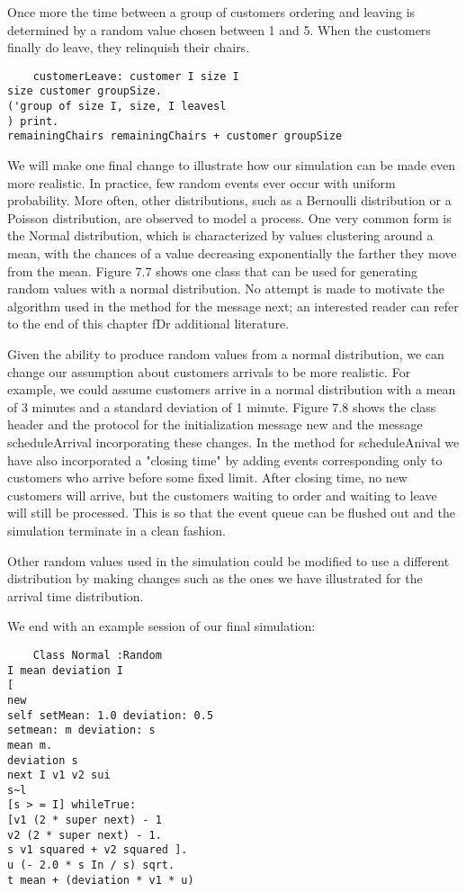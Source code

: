 Once more the time between a group of customers ordering and leaving
is determined by a random value chosen between 1 and 5. When the
customers finally do leave, they relinquish their chairs.

\begin{lstlisting}
    customerLeave: customer I size I
size customer groupSize.
('group of size I, size, I leavesl
) print.
remainingChairs remainingChairs + customer groupSize
\end{lstlisting}

We will make one final change to illustrate how our simulation can be made even
more realistic. In practice, few random events ever occur with uniform
probability. More often, other distributions, such as a Bernoulli distribution
or a Poisson distribution, are observed to model a process. One very common form
is the Normal distribution, which is characterized by values clustering around a
mean, with the chances of a value decreasing exponentially the farther they move
from the mean. Figure 7.7 shows one class that can be used for generating random
values with a normal distribution. No attempt is made to motivate the algorithm
used in the method for the message next; an interested reader can refer to the
end of this chapter fDr additional literature.

Given the ability to produce random values from a normal distribution, we can
change our assumption about customers arrivals to be more realistic. For
example, we could assume customers arrive in a normal distribution with a mean
of 3 minutes and a standard deviation of 1 minute. Figure 7.8 shows the class
header and the protocol for the initialization message new and the message
scheduleArrival incorporating these changes. In the method for scheduleAnival we
have also incorporated a "closing time" by adding events corresponding only to
customers who arrive before some fixed limit. After closing time, no new
customers will arrive, but the customers waiting to order and waiting to leave
will still be processed. This is so that the event queue can be flushed out and
the simulation terminate in a clean fashion.

Other random values used in the simulation could be modified to use a different
distribution by making changes such as the ones we have illustrated for the
arrival time distribution.

We end with an example session of our final simulation:
\begin{lstlisting}
    Class Normal :Random
I mean deviation I
[
new
self setMean: 1.0 deviation: 0.5
setmean: m deviation: s
mean m.
deviation s
next I v1 v2 sui
s~l
[s > = I] whileTrue:
[v1 (2 * super next) - 1
v2 (2 * super next) - 1.
s v1 squared + v2 squared ].
u (- 2.0 * s In / s) sqrt.
t mean + (deviation * v1 * u)
\end{lstlisting}

